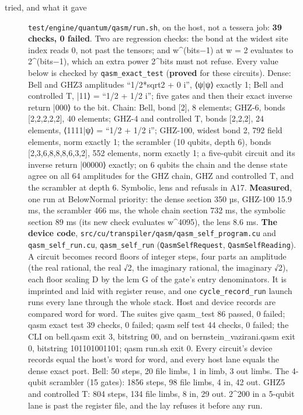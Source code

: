 \begin{description}
\item[{tried, and what it gave}] \texttt{test/\allowbreak{}engine/\allowbreak{}quantum/\allowbreak{}qasm/\allowbreak{}run.\allowbreak{}sh}, on the host, not a tessera job: \textbf{39 checks, 0 failed}. Two are regression checks: the bond at the widest site index reads 0, not past the tensors; and w\textasciicircum{}(bits−1) at w = 2 evaluates to 2\textasciicircum{}(bits−1), which an extra power 2\textasciicircum{}bits must not refuse. Every value below is checked by \texttt{qasm\_\allowbreak{}exact\_\allowbreak{}test} (\textbf{proved} for these circuits). Dense: Bell and GHZ3 amplitudes “1/2*sqrt2 + 0 i”, ⟨ψ|ψ⟩ exactly 1; Bell and controlled T, |11⟩ = “1/2 + 1/2 i”; five gates and then their exact inverse return |000⟩ to the bit. Chain: Bell, bond [2], 8 elements; GHZ-6, bonds [2,2,2,2,2], 40 elements; GHZ-4 and controlled T, bonds [2,2,2], 24 elements, ⟨1111|ψ⟩ = “1/2 + 1/2 i”; GHZ-100, widest bond 2, 792 field elements, norm exactly 1; the scrambler (10 qubits, depth 6), bonds [2,3,6,8,8,8,6,3,2], 552 elements, norm exactly 1; a five-qubit circuit and its inverse return |00000⟩ exactly; on 6 qubits the chain and the dense state agree on all 64 amplitudes for the GHZ chain, GHZ and controlled T, and the scrambler at depth 6. Symbolic, lens and refusals in A17. \textbf{Measured}, one run at BelowNormal priority: the dense section 350 µs, GHZ-100 15.9 ms, the scrambler 466 ms, the whole chain section 732 ms, the symbolic section 89 ms (its new check evaluates w\textasciicircum{}4095), the lens 8.6 ms. \textbf{The device code}, \texttt{src/\allowbreak{}cu/\allowbreak{}transpiler/\allowbreak{}qasm/\allowbreak{}qasm\_\allowbreak{}self\_\allowbreak{}program.\allowbreak{}cu} and \texttt{qasm\_\allowbreak{}self\_\allowbreak{}run.\allowbreak{}cu}, \texttt{qasm\_\allowbreak{}self\_\allowbreak{}run} (\texttt{Qasm\allowbreak{}Self\allowbreak{}Request}, \texttt{Qasm\allowbreak{}Self\allowbreak{}Reading}). A circuit becomes record floors of integer steps, four parts an amplitude (the real rational, the real √2, the imaginary rational, the imaginary √2), each floor scaling D by the lcm G of the gate's entry denominators. It is imprinted and laid with register reuse, and one \texttt{cycle\_\allowbreak{}record\_\allowbreak{}run} launch runs every lane through the whole stack. Host and device records are compared word for word. The suites give qasm\_\allowbreak{}test 86 passed, 0 failed; qasm exact test 39 checks, 0 failed; qasm self test 44 checks, 0 failed; the CLI on bell.qasm exit 3, bitstring 00, and on bernstein\_\allowbreak{}vazirani.qasm exit 0, bitstring 101101001101; qasm run.sh exit 0. Every circuit's device records equal the host's word for word, and every host lane equals the dense exact port. Bell: 50 steps, 20 file limbs, 1 in limb, 3 out limbs. The 4-qubit scrambler (15 gates): 1856 steps, 98 file limbs, 4 in, 42 out. GHZ5 and controlled T: 804 steps, 134 file limbs, 8 in, 29 out. 2\textasciicircum{}200 in a 5-qubit lane is past the register file, and the lay refuses it before any run.

\end{description}
